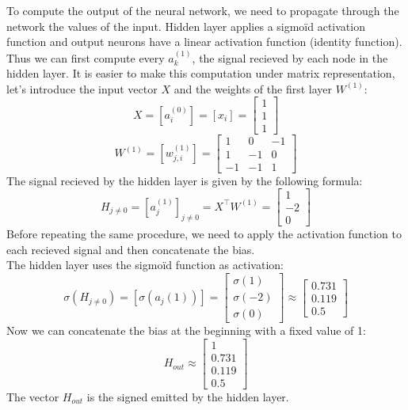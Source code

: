 \documentclass[a4paper, 10pt]{article}
\begin{document}
To compute the output of the neural network, we need to propagate
through the network the values of the input. Hidden layer applies a sigmoïd activation function
and output neurons have a linear activation function (identity function).
\\
Thus we can first compute every $a_k^{(1)}$, the signal recieved by each node in the hidden layer.
It is easier to make this computation under matrix representation, let's introduce the input vector $X$ and
the weights of the first layer $W^{(1)}$:
$$
X = [a_i^{(0)}] = [x_i] =\begin{bmatrix}
    1\\
    1\\
    1
\end{bmatrix}
$$
$$
W^{(1)} = [w_{j,i}^{(1)}] =  \begin{bmatrix}
    1 & 0 & -1\\
    1 & -1 & 0\\
    -1 & -1 & 1
\end{bmatrix}
$$
The signal recieved by the hidden layer is given by the following formula:
$$
H_{j\ne0} = [a_j^{(1)}]_{j\ne0} = X^\top W^{(1)} = \begin{bmatrix}
    1\\
    -2\\
    0
\end{bmatrix}
$$
Before repeating the same procedure, we need to apply the activation function
to each recieved signal and then concatenate the bias.
\\
The hidden layer uses the sigmoïd function as activation:
$$
\sigma(H_{j\ne0}) = [\sigma(a_j{(1)})] = \begin{bmatrix}
    \sigma(1)\\
    \sigma(-2)\\
    \sigma(0)
\end{bmatrix}
\approx \begin{bmatrix}
        0.731\\
        0.119\\
        0.5
\end{bmatrix}
$$
Now we can concatenate the bias at the beginning with a fixed value of 1:
$$
H_{out} \approx \begin{bmatrix}
    1\\
    0.731\\
    0.119\\
    0.5
\end{bmatrix}
$$
The vector $H_{out}$ is the signed emitted by the hidden layer.
\\
\end{document}
